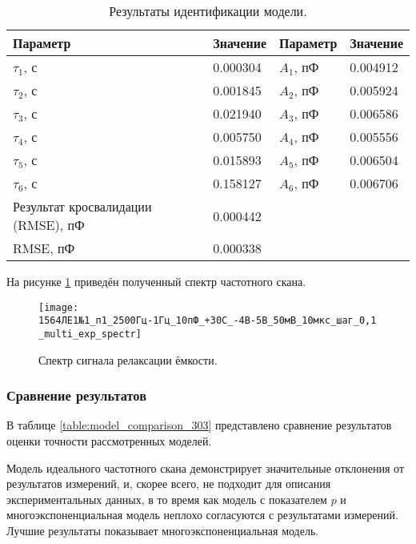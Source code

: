 	\begin{table}[!htp]
		\centering
		\caption{Результаты идентификации модели.}
		\begin{tabular}{|l|l|l|l|}
			\hline
			Параметр                           & Значение & Параметр  & Значение \\ \hline
			$\tau_1$, с                        & 0.000304 & $A_1$, пФ & 0.004912 \\ \hline
			$\tau_2$, с                        & 0.001845 & $A_2$, пФ & 0.005924 \\ \hline
			$\tau_3$, с                        & 0.021940 & $A_3$, пФ & 0.006586 \\ \hline
			$\tau_4$, с                        & 0.005750 & $A_4$, пФ & 0.005556 \\ \hline
			$\tau_5$, с                        & 0.015893 & $A_5$, пФ & 0.006504 \\ \hline
			$\tau_6$, с                        & 0.158127 & $A_6$, пФ & 0.006706 \\ \hline
			Результат кросвалидации (RMSE), пФ & 0.000442 &           &          \\ \hline
			RMSE, пФ                           & 0.000338 &           &          \\ \hline
		\end{tabular}
		\label{table:multi_exp_results_263}
	\end{table}

	На рисунке \ref{pic:multi_exp_spectr_303} приведён полученный спектр 
	частотного скана.

	\begin{figure}[!htp]
		\centering
		\texttt{[image: 1564ЛЕ1№1\_п1\_2500Гц-1Гц\_10пФ\_+30С\_-4В-5В\_50мВ\_10мкс\_шаг\_0,1\_multi\_exp\_spectr]}
		\caption{Спектр сигнала релаксации ёмкости.}
		\label{pic:multi_exp_spectr_303}
	\end{figure}


	\newpage
	\subsubsection{Сравнение результатов}
	В таблице \ref{table:model_comparison_303} представлено сравнение результатов
	оценки точности рассмотренных моделей. 

	Модель идеального частотного скана демонстрирует значительные отклонения от
	результатов измерений, и, скорее всего, не подходит для описания экспериментальных
	данных, в то время как модель с показателем $p$ и многоэкспоненциальная модель
	неплохо согласуются с результатами измерений. Лучшие результаты показывает
	многоэкспоненциальная модель.
	
